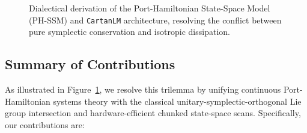 \documentclass[11pt,a4paper]{article}
\begin{document}
\begin{figure}[!t]
\caption{Dialectical derivation of the Port-Hamiltonian State-Space Model (PH-SSM) and \texttt{CartanLM} architecture, resolving the conflict between pure symplectic conservation and isotropic dissipation.}
\label{fig:dialectical_derivation}
\end{figure}

\subsection{Summary of Contributions}
As illustrated in Figure~\ref{fig:dialectical_derivation}, we resolve this trilemma by unifying continuous Port-Hamiltonian systems theory \cite{vanderschaft2014porthamiltonian,massaroli2019porthamiltonian,massaroli2020dissecting} with the classical unitary-symplectic-orthogonal Lie group intersection and hardware-efficient chunked state-space scans. Specifically, our contributions are:
\end{document}
